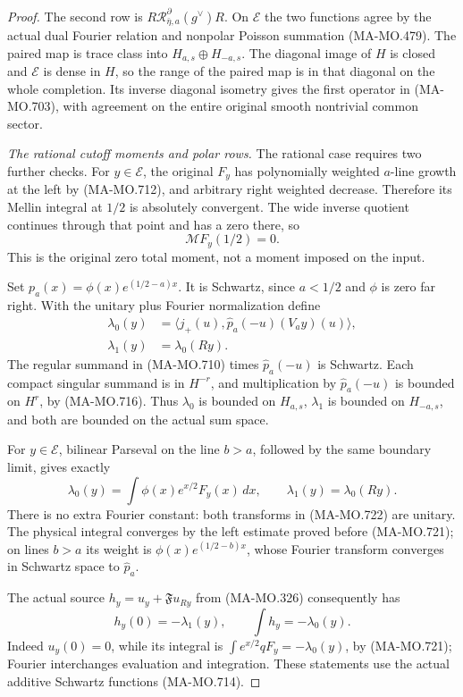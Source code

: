 \begin{proof}
The second row is
\(R\mathscr R_{\bar\eta,a}^{\partial}(g^\vee)R\).
On \(\mathcal E\) the two functions agree by
the actual dual Fourier relation and nonpolar
Poisson summation (MA-MO.479). The paired map
is trace class into \(H_{a,s}\oplus H_{-a,s}\).
The diagonal image of \(H\) is closed and
\(\mathcal E\) is dense in \(H\), so the range
of the paired map is in that diagonal on the
whole completion. Its inverse diagonal isometry
gives the first operator in (MA-MO.703),
with agreement on the entire original smooth
nontrivial common sector.

\emph{The rational cutoff moments and polar rows.}
The rational case requires two further checks.
For \(y\in\mathcal E\), the original \(F_y\)
has polynomially weighted \(a\)-line growth
at the left by (MA-MO.712), and arbitrary
right weighted decrease. Therefore its Mellin
integral at \(1/2\) is absolutely convergent.
The wide inverse quotient continues through
that point and has a zero there, so
\[
          \mathcal MF_y(1/2)=0 .
 \tag{MA-MO.721}
\]
This is the original zero total moment, not
a moment imposed on the input.

Set \(p_a(x)=\phi(x)e^{(1/2-a)x}\).
It is Schwartz, since \(a<1/2\) and
\(\phi\) is zero far right. With the unitary
plus Fourier normalization define
\[
 \begin{aligned}
 \lambda_0(y)
    &=\big\langle j_+(u),
                     \widehat p_a(-u)(V_ay)(u)\big\rangle,\\
 \lambda_1(y)&=\lambda_0(Ry).
 \end{aligned}
 \tag{MA-MO.722}
\]
The regular summand in (MA-MO.710) times
\(\widehat p_a(-u)\) is Schwartz.
Each compact singular summand is in \(H^{-r}\),
and multiplication by \(\widehat p_a(-u)\)
is bounded on \(H^r\), by (MA-MO.716).
Thus \(\lambda_0\) is bounded on \(H_{a,s}\),
\(\lambda_1\) is bounded on \(H_{-a,s}\), and
both are bounded on the actual sum space.

For \(y\in\mathcal E\), bilinear Parseval
on the line \(b>a\), followed by the same
boundary limit, gives exactly
\[
 \lambda_0(y)=\int\phi(x)e^{x/2}F_y(x)\,dx,
              \qquad \lambda_1(y)=\lambda_0(Ry).
 \tag{MA-MO.723}
\]
There is no extra Fourier constant: both
transforms in (MA-MO.722) are unitary.
The physical integral converges by the
left estimate proved before (MA-MO.721);
on lines \(b>a\) its weight is
\(\phi(x)e^{(1/2-b)x}\), whose Fourier
transform converges in Schwartz space to
\(\widehat p_a\).

The actual source \(h_y=u_y+\mathfrak F u_{Ry}\)
from (MA-MO.326) consequently has
\[
       h_y(0)=-\lambda_1(y),\qquad
       \int h_y=-\lambda_0(y).
 \tag{MA-MO.724}
\]
Indeed \(u_y(0)=0\), while its integral is
\(\int e^{x/2}qF_y=-\lambda_0(y)\), by
(MA-MO.721); Fourier interchanges evaluation
and integration. These statements use the
actual additive Schwartz functions (MA-MO.714).


\end{proof}
